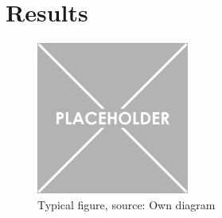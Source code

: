 \chapter{Results}
\label{ch:results}

\begin{figure}[ht]
	\centering
	\includegraphics[width=5cm]{images/Placeholder}
	\caption{Typical figure, source: Own diagram}
	\label{fig:1}
\end{figure}
